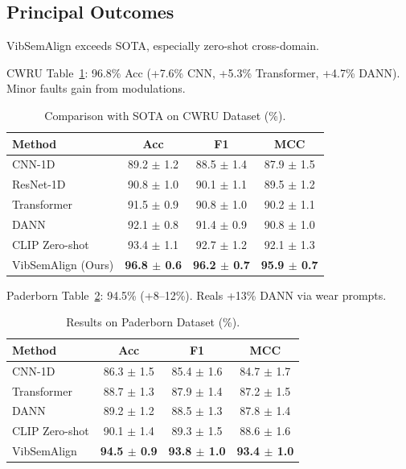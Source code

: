 \subsection{Principal Outcomes}

VibSemAlign exceeds SOTA, especially zero-shot cross-domain.

CWRU Table~\ref{tab:iv}: 96.8\% Acc (+7.6\% CNN, +5.3\% Transformer, +4.7\% DANN). Minor faults gain from modulations.

\begin{table}[htbp]
\centering
\caption{Comparison with SOTA on CWRU Dataset (\%).}
\label{tab:iv}
\begin{tabular}{@{}lccc@{}}
\toprule
Method & Acc & F1 & MCC \\
\midrule
CNN-1D \cite{wen2019convolutional} & 89.2 $\pm$ 1.2 & 88.5 $\pm$ 1.4 & 87.9 $\pm$ 1.5 \\
ResNet-1D \cite{he2016deep} & 90.8 $\pm$ 1.0 & 90.1 $\pm$ 1.1 & 89.5 $\pm$ 1.2 \\
Transformer \cite{vaswani2017attention} & 91.5 $\pm$ 0.9 & 90.8 $\pm$ 1.0 & 90.2 $\pm$ 1.1 \\
DANN \cite{ganin2016domain} & 92.1 $\pm$ 0.8 & 91.4 $\pm$ 0.9 & 90.8 $\pm$ 1.0 \\
CLIP Zero-shot & 93.4 $\pm$ 1.1 & 92.7 $\pm$ 1.2 & 92.1 $\pm$ 1.3 \\
\midrule
VibSemAlign (Ours) & \textbf{96.8 $\pm$ 0.6} & \textbf{96.2 $\pm$ 0.7} & \textbf{95.9 $\pm$ 0.7} \\
\bottomrule
\end{tabular}
\end{table}

Paderborn Table~\ref{tab:v}: 94.5\% (+8--12\%). Reals +13\% DANN via wear prompts.

\begin{table}[htbp]
\centering
\caption{Results on Paderborn Dataset (\%).}
\label{tab:v}
\begin{tabular}{@{}lccc@{}}
\toprule
Method & Acc & F1 & MCC \\
\midrule
CNN-1D & 86.3 $\pm$ 1.5 & 85.4 $\pm$ 1.6 & 84.7 $\pm$ 1.7 \\
Transformer & 88.7 $\pm$ 1.3 & 87.9 $\pm$ 1.4 & 87.2 $\pm$ 1.5 \\
DANN & 89.2 $\pm$ 1.2 & 88.5 $\pm$ 1.3 & 87.8 $\pm$ 1.4 \\
CLIP Zero-shot & 90.1 $\pm$ 1.4 & 89.3 $\pm$ 1.5 & 88.6 $\pm$ 1.6 \\
\midrule
VibSemAlign & \textbf{94.5 $\pm$ 0.9} & \textbf{93.8 $\pm$ 1.0} & \textbf{93.4 $\pm$ 1.0} \\
\bottomrule
\end{tabular}
\end{table}

